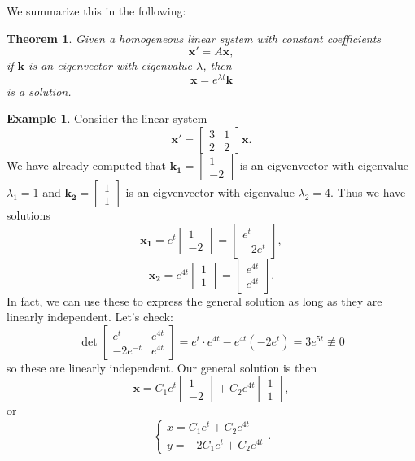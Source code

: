 \documentclass[12pt]{amsart}
\numberwithin{equation}{section}
\theoremstyle{plain} %
\newtheorem{thm}[equation]{Theorem}
\theoremstyle{definition}
\newtheorem{ex}[equation]{Example}
\theoremstyle{remark}
\begin{document}
We summarize this in the following:

\begin{thm}
Given a homogeneous linear system with constant coefficients
\[ \mathbf{x'} = A \mathbf{x},\]
if $\mathbf{k}$ is an eigenvector with eigenvalue $\lambda$, then
\[ \mathbf{x} = e^{\lambda t} \mathbf{k}\]
is a solution.
\end{thm}

\begin{ex}
Consider the linear system
\[ \mathbf{x}' = \begin{bmatrix} 3 & 1  \\ 2 & 2\end{bmatrix} \mathbf{x}.\]
We have already computed that  $\mathbf{k_1} = \begin{bmatrix} 1 \\ -2\end{bmatrix}$ is an eigvenvector with eigenvalue $\lambda_1=1$ and
$\mathbf{k_2} = \begin{bmatrix} 1 \\ 1 \end{bmatrix}$ is an eigvenvector with eigenvalue $\lambda_2=4$. Thus we have solutions
\[ \mathbf{x_1}  = e^t  \begin{bmatrix} 1 \\ -2\end{bmatrix} =  \begin{bmatrix} e^t \\ -2e^{t} \end{bmatrix},\]
\[ \mathbf{x_2}  = e^{4t}  \begin{bmatrix} 1 \\1 \end{bmatrix} =  \begin{bmatrix} e^{4t} \\ e^{4t} \end{bmatrix}.\]
In fact, we can use these to express the general solution as long as they are linearly independent. Let's check:
\[ \det \begin{bmatrix} e^t &  e^{4t} \\ -2e^{-t}  & e^{4t}\end{bmatrix} = e^t \cdot e^{4t} - e^{4t} ( -2 e^{t} ) = 3 e^{5t}  \not\equiv 0\]
so these are linearly independent. Our general solution is then 
\[ \mathbf{x} = C_1 e^t  \begin{bmatrix} 1 \\ -2\end{bmatrix} + C_2 e^{4t}  \begin{bmatrix} 1 \\1 \end{bmatrix},\]
or 
\[ \begin{cases} x= C_1 e^t + C_2 e^{4t} \\ y= -2C_1 e^t + C_2 e^{4t}\end{cases}.\]
\end{ex}
\end{document}
